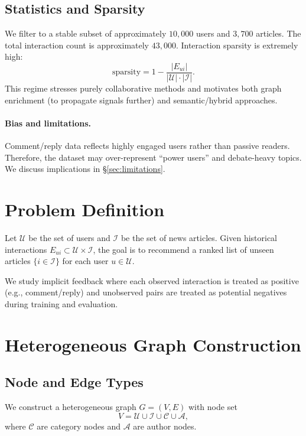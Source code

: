 \documentclass[11pt]{article}
\begin{document}
\subsection{Statistics and Sparsity}
We filter to a stable subset of approximately \(10{,}000\) users and \(3{,}700\) articles. The total interaction count is approximately \(43{,}000\). Interaction sparsity is extremely high:
\begin{equation}
\text{sparsity} = 1 - \frac{|E_{ui}|}{|\mathcal{U}|\cdot|\mathcal{I}|}.
\end{equation}
This regime stresses purely collaborative methods and motivates both graph enrichment (to propagate signals further) and semantic/hybrid approaches.

\paragraph{Bias and limitations.}
Comment/reply data reflects highly engaged users rather than passive readers. Therefore, the dataset may over-represent ``power users'' and debate-heavy topics. We discuss implications in \S\ref{sec:limitations}.

\section{Problem Definition}
Let \(\mathcal{U}\) be the set of users and \(\mathcal{I}\) be the set of news articles. Given historical interactions \(E_{ui}\subset \mathcal{U}\times\mathcal{I}\), the goal is to recommend a ranked list of unseen articles \(\{i\in\mathcal{I}\}\) for each user \(u\in\mathcal{U}\).

We study implicit feedback where each observed interaction is treated as positive (e.g., comment/reply) and unobserved pairs are treated as potential negatives during training and evaluation.

\section{Heterogeneous Graph Construction}
\subsection{Node and Edge Types}
We construct a heterogeneous graph \(G=(V,E)\) with node set
\begin{equation}
V = \mathcal{U} \cup \mathcal{I} \cup \mathcal{C} \cup \mathcal{A},
\end{equation}
where \(\mathcal{C}\) are category nodes and \(\mathcal{A}\) are author nodes.
\end{document}

